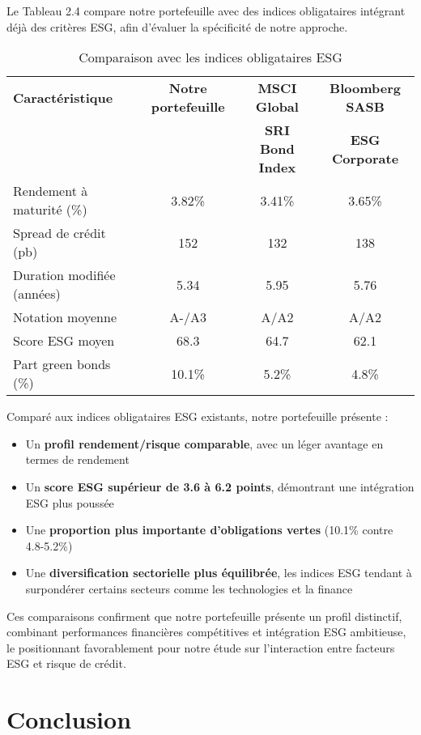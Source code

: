 Le Tableau 2.4 compare notre portefeuille avec des indices obligataires intégrant déjà des critères ESG, afin d'évaluer la spécificité de notre approche.

\begin{table}[h]
\centering
\caption{Comparaison avec les indices obligataires ESG}
\begin{tabular}{lccc}
\hline
\textbf{Caractéristique} & \textbf{Notre portefeuille} & \textbf{MSCI Global} & \textbf{Bloomberg SASB} \\
& & \textbf{SRI Bond Index} & \textbf{ESG Corporate} \\
\hline
Rendement à maturité (\%) & 3.82\% & 3.41\% & 3.65\% \\
Spread de crédit (pb) & 152 & 132 & 138 \\
Duration modifiée (années) & 5.34 & 5.95 & 5.76 \\
Notation moyenne & A-/A3 & A/A2 & A/A2 \\
Score ESG moyen & 68.3 & 64.7 & 62.1 \\
Part green bonds (\%) & 10.1\% & 5.2\% & 4.8\% \\
\hline
\end{tabular}
\end{table}

Comparé aux indices obligataires ESG existants, notre portefeuille présente :

\begin{itemize}
    \item Un \textbf{profil rendement/risque comparable}, avec un léger avantage en termes de rendement
    \item Un \textbf{score ESG supérieur de 3.6 à 6.2 points}, démontrant une intégration ESG plus poussée
    \item Une \textbf{proportion plus importante d'obligations vertes} (10.1\% contre 4.8-5.2\%)
    \item Une \textbf{diversification sectorielle plus équilibrée}, les indices ESG tendant à surpondérer certains secteurs comme les technologies et la finance
\end{itemize}

Ces comparaisons confirment que notre portefeuille présente un profil distinctif, combinant performances financières compétitives et intégration ESG ambitieuse, le positionnant favorablement pour notre étude sur l'interaction entre facteurs ESG et risque de crédit.

\section*{Conclusion}

